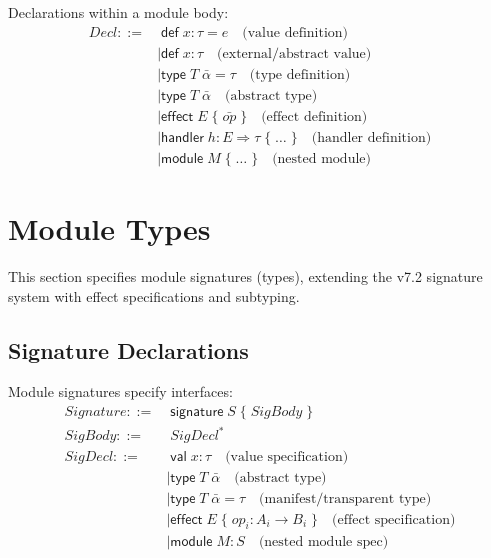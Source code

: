 \begin{definition}
\label{def:decl-forms}
Declarations within a module body:
\begin{align}
\mathit{Decl} ::=&\; \mathsf{def}\; x : \tau = e \quad \text{(value definition)} \\
    &\mid \mathsf{def}\; x : \tau \quad \text{(external/abstract value)} \\
    &\mid \mathsf{type}\; T\; \bar{\alpha} = \tau \quad \text{(type definition)} \\
    &\mid \mathsf{type}\; T\; \bar{\alpha} \quad \text{(abstract type)} \\
    &\mid \mathsf{effect}\; E\; \{\; \bar{op}\; \} \quad \text{(effect definition)} \\
    &\mid \mathsf{handler}\; h : E \Rightarrow \tau\; \{\; \ldots\; \} \quad \text{(handler definition)} \\
    &\mid \mathsf{module}\; M\; \{\; \ldots\; \} \quad \text{(nested module)}
\end{align}
\end{definition}

\section{Module Types}
\label{sec:module-types}

This section specifies module signatures (types), extending the v7.2 signature system with effect specifications and subtyping.

\subsection{Signature Declarations}
\label{subsec:signature-declarations}

\begin{definition}
\label{def:signature-syntax}
Module signatures specify interfaces:
\begin{align}
\mathit{Signature} ::=&\; \mathsf{signature}\; S\; \{\; \mathit{SigBody}\; \} \\
\mathit{SigBody} ::=&\; \mathit{SigDecl}^* \\
\mathit{SigDecl} ::=&\; \mathsf{val}\; x : \tau \quad \text{(value specification)} \\
    &\mid \mathsf{type}\; T\; \bar{\alpha} \quad \text{(abstract type)} \\
    &\mid \mathsf{type}\; T\; \bar{\alpha} = \tau \quad \text{(manifest/transparent type)} \\
    &\mid \mathsf{effect}\; E\; \{\; op_i : A_i \to B_i \; \} \quad \text{(effect specification)} \\
    &\mid \mathsf{module}\; M : S \quad \text{(nested module spec)}
\end{align}
\end{definition}

